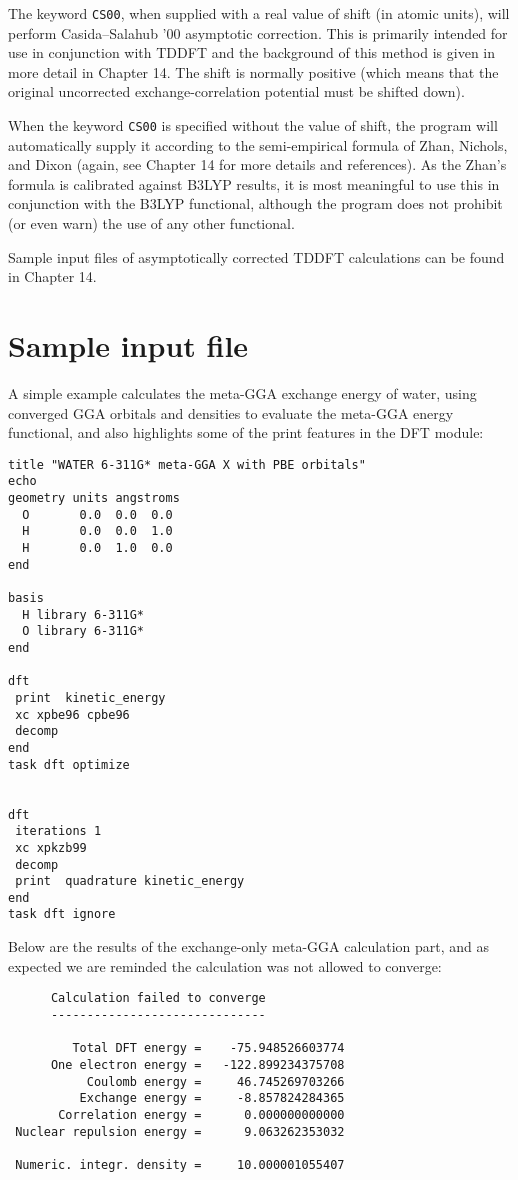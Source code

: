 The keyword \verb+CS00+, when supplied with a real value of shift (in atomic units),
will perform Casida--Salahub '00 asymptotic correction.  This is primarily intended
for use in conjunction with TDDFT and the background of this method is given in more
detail in Chapter 14.  The shift is normally positive (which means that the original
uncorrected exchange-correlation potential must be shifted down).

When the keyword \verb+CS00+ is specified without the value of shift, the program will
automatically supply it according to the semi-empirical formula of Zhan, Nichols, and
Dixon (again, see Chapter 14 for more details and references).  As the Zhan's formula 
is calibrated against B3LYP results, it is most meaningful to use this in conjunction
with the B3LYP functional, although the program does not prohibit (or even warn) the use
of any other functional.

Sample input files of asymptotically corrected TDDFT calculations can be found in 
Chapter 14.

\section{Sample input file}
\label{sec:DFTsample}
A simple example  calculates the meta-GGA 
exchange
energy of water, using converged GGA orbitals and
densities to evaluate the meta-GGA energy functional,
and also highlights some of
the print features in the DFT module:
\begin{verbatim}
title "WATER 6-311G* meta-GGA X with PBE orbitals"
echo
geometry units angstroms
  O       0.0  0.0  0.0
  H       0.0  0.0  1.0
  H       0.0  1.0  0.0
end

basis
  H library 6-311G*
  O library 6-311G*
end
 
dft
 print  kinetic_energy
 xc xpbe96 cpbe96
 decomp
end
task dft optimize


dft
 iterations 1
 xc xpkzb99
 decomp
 print  quadrature kinetic_energy
end
task dft ignore
\end{verbatim}

Below are
the results of the exchange-only
meta-GGA calculation part, and as expected
we are reminded the calculation was not allowed
to converge:

\begin{verbatim}
      Calculation failed to converge
      ------------------------------

         Total DFT energy =    -75.948526603774
      One electron energy =   -122.899234375708
           Coulomb energy =     46.745269703266
          Exchange energy =     -8.857824284365
       Correlation energy =      0.000000000000
 Nuclear repulsion energy =      9.063262353032

 Numeric. integr. density =     10.000001055407
\end{verbatim}



